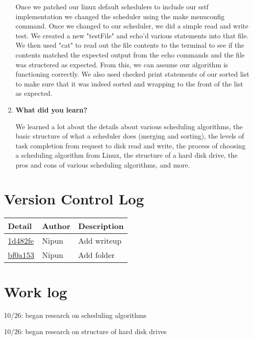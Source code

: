 \documentclass[onecolumn, draftclsnofoot,10pt, compsoc]{IEEEtran}
\begin{document}
\begin{enumerate}
		Once we patched our linux default schedulers to include our sstf implementation we changed the scheduler using the make menuconfig command.
		Once we changed to our scheduler, we did a simple read and write test. We created a new "testFile" and echo'd various statements into that file.
		We then used "cat" to read out the file contents to the terminal to see if the contents matched the expected output from the echo commands and
		the file was structered as expected. From this, we can assume our algorithm is functioning correctly. We also used checked print statements 
		of our sorted list to make sure that it was indeed sorted and wrapping to the front of the list as expected. 
	
		\item \textbf{What did you learn?}
	
		We learned a lot about the details about various scheduling algorithms, the basic structure of what a scheduler
		does (merging and sorting), the levels of task completion from request to disk read and write, the process
		of choosing a scheduling algorithm from Linux, the structure of a hard disk drive, the pros and cons 
		of various scheduling algorithms, and more. 
		
	\end{enumerate}
	
\section{Version Control Log}
	\begin{tabular}{l l p{1.5in}}\textbf{Detail} & \textbf{Author} & \textbf{Description}\\\hline
	\href{https://github.com/NipunBathini/CS444/commit/1d482fea38c7a7daf2162699999aade0bc2e7057#diff-026641ace18fe3818f5340bdb0f502a0}{1d482fe} & Nipun & Add writeup\\\hline
	\href{https://github.com/NipunBathini/CS444/commit/bf0a15325a431b968b513684443627d0cf8b2a98#diff-026641ace18fe3818f5340bdb0f502a0}{bf0a153} & Nipun & Add folder\\\hline
	\end{tabular}


\section{Work log}

	10/26: began research on scheduling algorithms
	
	10/26: began research on structure of hard disk drives
	
\end{document}
